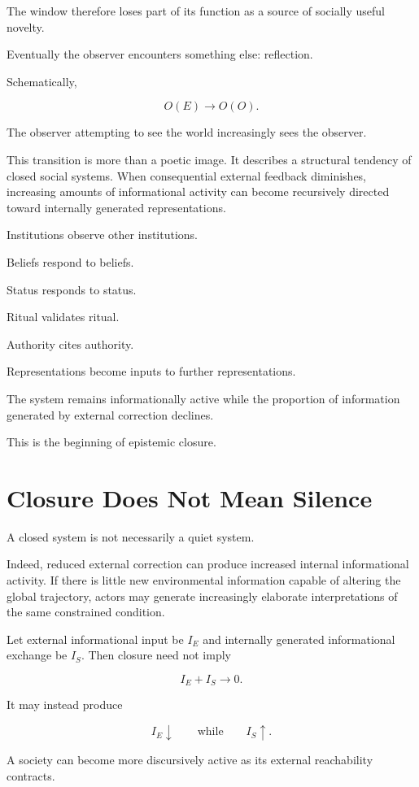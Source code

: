 \documentclass[11pt,oneside]{book}
\theoremstyle{definition}
\theoremstyle{remark}
\begin{document}
The window therefore loses part of its function as a source of socially useful novelty.

Eventually the observer encounters something else: reflection.

Schematically,

\[
O(E)
\rightarrow
O(O).
\]

The observer attempting to see the world increasingly sees the observer.

This transition is more than a poetic image. It describes a structural tendency of closed social systems. When consequential external feedback diminishes, increasing amounts of informational activity can become recursively directed toward internally generated representations.

Institutions observe other institutions.

Beliefs respond to beliefs.

Status responds to status.

Ritual validates ritual.

Authority cites authority.

Representations become inputs to further representations.

The system remains informationally active while the proportion of information generated by external correction declines.

This is the beginning of epistemic closure.

\section{Closure Does Not Mean Silence}

A closed system is not necessarily a quiet system.

Indeed, reduced external correction can produce increased internal informational activity. If there is little new environmental information capable of altering the global trajectory, actors may generate increasingly elaborate interpretations of the same constrained condition.

Let external informational input be \(I_E\) and internally generated informational exchange be \(I_S\). Then closure need not imply

\[
I_E+I_S\rightarrow0.
\]

It may instead produce

\[
I_E\downarrow
\qquad\text{while}\qquad
I_S\uparrow.
\]

A society can become more discursively active as its external reachability contracts.
\end{document}
